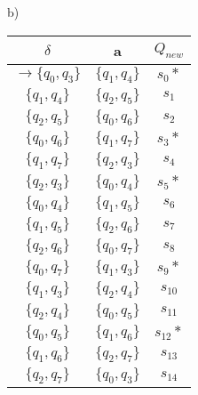 \documentclass[a4paper, 10pt]{article}
\begin{document}
  \newpage

  b)\\

  \begin{center} 
    \begin{tabular}{c|c|c} 
     \hline
     $\delta$ & a & $Q_{new}$\\ [0.5ex] 
     \hline\hline
     $\rightarrow \{q_0, q_3\}$ & $\{q_1, q_4\}$ & $s_{0}*$\\
     \hline
     $\{q_1, q_4\}$ & $\{q_2, q_5\}$ & $s_{1}$\\
     \hline
     $\{q_2, q_5\}$ & $\{q_0, q_6\}$ & $s_{2}$\\
     \hline
     $\{q_0, q_6\}$ & $\{q_1, q_7\}$ & $s_{3}*$\\
     \hline
     $\{q_1, q_7\}$ & $\{q_2, q_3\}$ & $s_{4}$\\
     \hline
     $\{q_2, q_3\}$ & $\{q_0, q_4\}$ & $s_{5}*$\\
     \hline
     $\{q_0, q_4\}$ & $\{q_1, q_5\}$ & $s_{6}$\\
     \hline
     $\{q_1, q_5\}$ & $\{q_2, q_6\}$ & $s_{7}$\\
     \hline
     $\{q_2, q_6\}$ & $\{q_0, q_7\}$ & $s_{8}$\\
     \hline
     $\{q_0, q_7\}$ & $\{q_1, q_3\}$ & $s_{9}*$\\
     \hline
     $\{q_1, q_3\}$ & $\{q_2, q_4\}$ & $s_{10}$\\
     \hline
     $\{q_2, q_4\}$ & $\{q_0, q_5\}$ & $s_{11}$\\
     \hline
     $\{q_0, q_5\}$ & $\{q_1, q_6\}$ & $s_{12}*$\\
     \hline
     $\{q_1, q_6\}$ & $\{q_2, q_7\}$ & $s_{13}$\\
     \hline
     $\{q_2, q_7\}$ & $\{q_0, q_3\}$ & $s_{14}$\\
     \hline
    \end{tabular}
\end{center}
\end{document}
